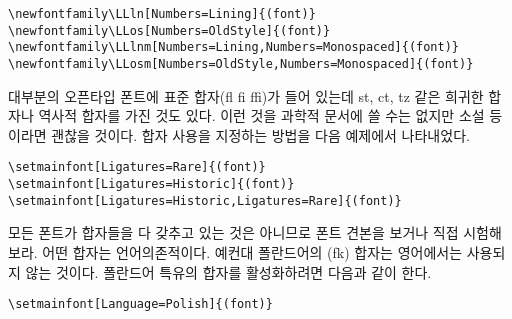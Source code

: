 \begin{code}
\begin{verbatim}
\newfontfamily\LLln[Numbers=Lining]{(font)}
\newfontfamily\LLos[Numbers=OldStyle]{(font)}
\newfontfamily\LLlnm[Numbers=Lining,Numbers=Monospaced]{(font)}
\newfontfamily\LLosm[Numbers=OldStyle,Numbers=Monospaced]{(font)}
\end{verbatim}
\end{code}

대부분의 오픈타입 폰트에 표준 합자(fl fi ffi)가 들어 있는데 st, ct, tz 같은 희귀한 합자나 역사적 합자를 가진 것도 있다. 이런 것을 과학적 문서에 쓸 수는 없지만 소설 등이라면 괜찮을 것이다. 합자 사용을 지정하는 방법을 다음 예제에서 나타내었다.

\begin{code}
\begin{verbatim}
\setmainfont[Ligatures=Rare]{(font)}
\setmainfont[Ligatures=Historic]{(font)}
\setmainfont[Ligatures=Historic,Ligatures=Rare]{(font)}
\end{verbatim}
\end{code}

모든 폰트가 합자들을 다 갖추고 있는 것은 아니므로 폰트 견본을 보거나 직접 시험해보라.
어떤 합자는 언어의존적이다. 예컨대 폴란드어의 (fk) 합자는 영어에서는 사용되지 않는 것이다. 폴란드어 특유의 합자를 활성화하려면 다음과 같이 한다.
\begin{code}
\begin{verbatim}
\setmainfont[Language=Polish]{(font)}
\end{verbatim}
\end{code}


